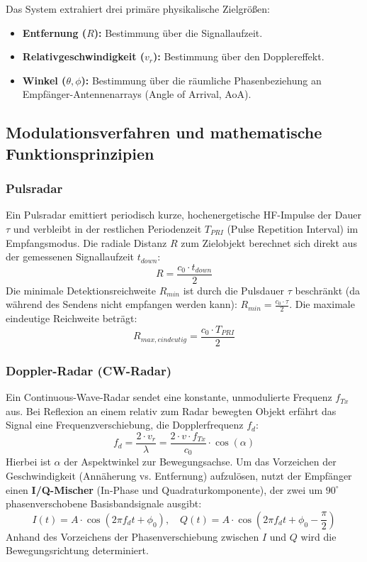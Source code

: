 \documentclass[8pt,a4paper]{article}
\begin{document}
Das System extrahiert drei primäre physikalische Zielgrößen:
\begin{itemize}
    \item \textbf{Entfernung ($R$):} Bestimmung über die Signallaufzeit.
    \item \textbf{Relativgeschwindigkeit ($v_r$):} Bestimmung über den Dopplereffekt.
    \item \textbf{Winkel ($\theta, \phi$):} Bestimmung über die räumliche Phasenbeziehung an Empfänger-Antennenarrays (Angle of Arrival, AoA).
\end{itemize}

\subsection{Modulationsverfahren und mathematische Funktionsprinzipien}

\subsubsection{Pulsradar}
Ein Pulsradar emittiert periodisch kurze, hochenergetische HF-Impulse der Dauer $\tau$ und verbleibt in der restlichen Periodenzeit $T_{PRI}$ (Pulse Repetition Interval) im Empfangsmodus. Die radiale Distanz $R$ zum Zielobjekt berechnet sich direkt aus der gemessenen Signallaufzeit $t_{down}$:
\begin{equation}
    R = \frac{c_0 \cdot t_{down}}{2}
\end{equation}
Die minimale Detektionsreichweite $R_{min}$ ist durch die Pulsdauer $\tau$ beschränkt (da während des Sendens nicht empfangen werden kann): $R_{min} = \frac{c_0 \cdot \tau}{2}$. Die maximale eindeutige Reichweite beträgt:
\begin{equation}
    R_{max, eindeutig} = \frac{c_0 \cdot T_{PRI}}{2}
\end{equation}

\subsubsection{Doppler-Radar (CW-Radar)}
Ein Continuous-Wave-Radar sendet eine konstante, unmodulierte Frequenz $f_{Tx}$ aus. Bei Reflexion an einem relativ zum Radar bewegten Objekt erfährt das Signal eine Frequenzverschiebung, die Dopplerfrequenz $f_d$:
\begin{equation}
    f_d = \frac{2 \cdot v_r}{\lambda} = \frac{2 \cdot v \cdot f_{Tx}}{c_0} \cdot \cos(\alpha)
\end{equation}
Hierbei ist $\alpha$ der Aspektwinkel zur Bewegungsachse. Um das Vorzeichen der Geschwindigkeit (Annäherung vs. Entfernung) aufzulösen, nutzt der Empfänger einen \textbf{I/Q-Mischer} (In-Phase und Quadraturkomponente), der zwei um $90^\circ$ phasenverschobene Basisbandsignale ausgibt:
\begin{equation}
    I(t) = A \cdot \cos(2\pi f_d t + \phi_0), \quad Q(t) = A \cdot \cos(2\pi f_d t + \phi_0 - \frac{\pi}{2})
\end{equation}
Anhand des Vorzeichens der Phasenverschiebung zwischen $I$ und $Q$ wird die Bewegungsrichtung determiniert.
\end{document}
